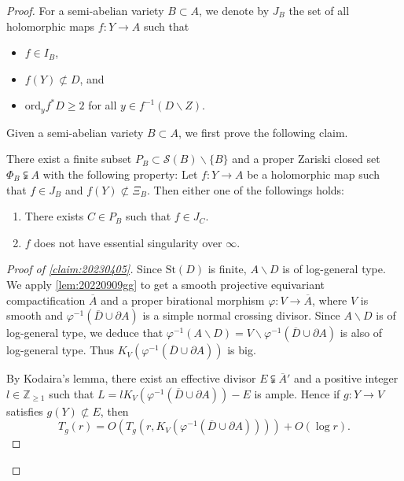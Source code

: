 \documentclass[10pt,a4paper]{amsart}
\begin{document}
	\begin{proof}
		For a semi-abelian variety $B\subset A$, we denote by $J_B$ the set of all holomorphic maps $f:Y\to A$ such that 
		\begin{itemize}
			\item
			$f\in I_B$,  
			\item
			$f(Y)\not\subset D$, and
			\item
			$\mathrm{ord}_yf^*D\geq 2$ for all $y\in f^{-1}(D\backslash Z)$. \end{itemize}
		Given a semi-abelian variety $B\subset A$, we first prove the following claim.
		
		\begin{claim}\label{claim:20230405}
			There exist a finite subset $P_B\subset \mathcal{S}(B)\backslash\{B\}$ and a proper Zariski closed set $\Phi_B\subsetneqq A$ with the following property:
			Let $f:Y\to A$ be a holomorphic map such that $f\in J_B$ and $f(Y)\not\subset \Xi_B$. 
			Then either one of the followings holds:
			\begin{enumerate}[label=(\alph*)]
				\item
				There exists $C\in P_B$ such that $f\in J_C$.
				\item
				$f$ does not have essential singularity over $\infty$.
			\end{enumerate}
		\end{claim}
		
		\begin{proof}[Proof of \cref{claim:20230405}]
			Since $\mathrm{St}(D)$ is finite, $A\backslash D$ is of log-general type.
			We apply \cref{lem:20220909gg} to get a smooth projective equivariant compactification $\overline{A}$ and a proper birational morphism $\varphi:V\to \overline{A}$, where $V$ is smooth and $\varphi^{-1}(\overline{D}\cup \partial A)$ is a simple normal crossing divisor.
			Since $A\backslash D$ is of log-general type, we deduce that $\varphi ^{-1}(A\backslash D)=V\backslash \varphi^{-1}(\overline{D}\cup \partial A)$ is also of log-general type.
			Thus $K_{V}(\varphi^{-1}(\overline{D}\cup \partial A))$ is big.
			
			By Kodaira's lemma, there exist an effective divisor $E\subsetneqq \overline{A}'$ and a positive integer $l\in\mathbb Z_{\geq 1}$ such that $L=lK_{V}(\varphi^{-1}(\overline{D}\cup \partial A))-E$ is ample.	
			Hence if $g:Y\to V$ satisfies $g(Y)\not\subset E$, then 
			$$T_{g}(r)= O( T_{g}(r,K_{V}(\varphi^{-1}(\overline{D}\cup \partial A))))+O(\log r).$$ 	
			

\end{proof}
\end{proof}
\end{document}
